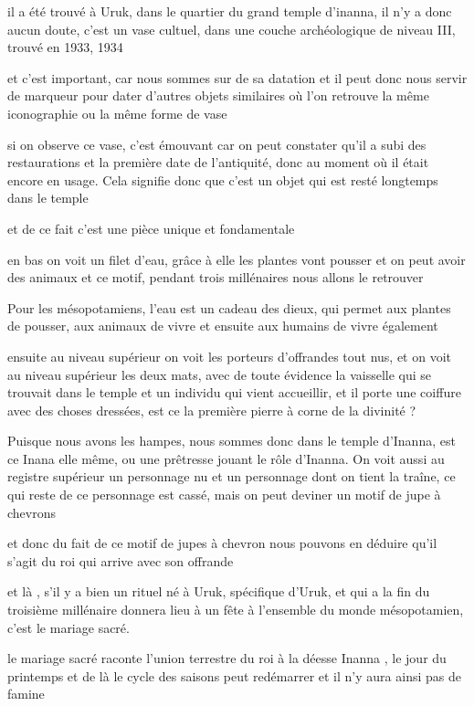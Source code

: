 \documentclass[a4paper,10pt]{article}
\begin{document}
\begin{itemize}
  [Warning: Image ignored] %
 

il a été trouvé à Uruk, dans le quartier du grand temple
d'inanna, il n'y a donc aucun doute,
c'est un vase cultuel, dans une couche archéologique
de niveau III, trouvé en 1933, 1934

et c'est important, car nous sommes sur de sa datation
et il peut donc nous servir de marqueur pour dater
d'autres objets similaires où l'on
retrouve la même iconographie ou la même forme de vase

si on observe ce vase, c'est émouvant car on peut
constater qu'il a subi des restaurations  et la
première date de l'antiquité, donc au moment où il
était encore en usage. Cela signifie donc que c'est un
objet qui est resté longtemps dans le temple

et de ce fait c'est une pièce unique et fondamentale

en bas on voit un filet d'eau, grâce à elle les 
plantes vont pousser  et on peut avoir des animaux et ce motif, pendant
trois millénaires nous allons le retrouver

Pour les mésopotamiens, l'eau est un cadeau des dieux,
qui permet aux plantes de pousser, aux animaux de vivre et ensuite aux
humains de vivre également

ensuite au niveau supérieur on voit les porteurs
d'offrandes tout nus, et on voit au niveau supérieur
les deux mats, avec de toute évidence la vaisselle qui se trouvait dans
le temple et un individu qui vient accueillir, et il porte une coiffure
avec des choses dressées, est  ce la première pierre à corne de la
divinité ?

Puisque nous avons les hampes, nous sommes donc dans le temple
d'Inanna, est ce Inana elle même, ou une prêtresse
jouant le rôle d'Inanna. On voit aussi au registre
supérieur un personnage nu et un personnage dont on tient la traîne, ce
qui reste de ce personnage est cassé, mais on peut deviner un motif de
jupe à chevrons

et donc du fait de ce motif de jupes à chevron nous pouvons en déduire
qu'il s'agit du roi qui arrive avec
son offrande

et là , s'il y a bien un rituel né à Uruk, spécifique
d'Uruk, et qui a la fin du troisième millénaire
donnera lieu à un fête à l'ensemble du monde
mésopotamien, c'est le mariage sacré.

le mariage sacré  raconte l'union terrestre du roi à la
déesse Inanna , le jour du printemps et de là le cycle des saisons peut
redémarrer et il n'y aura ainsi pas de famine


\end{itemize}
\end{document}
